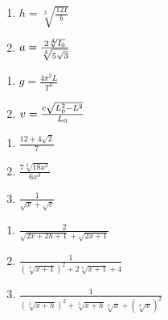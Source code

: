 \documentclass{ximera}
\begin{document}
\begin{multicols}{2}
\begin{enumerate}
\setcounter{enumi}{\value{HW}}


\item $h = \sqrt[3]{\frac{12I}{b}}$ 

\item  $a = \frac{2 \sqrt[4]{I_{\text{\tiny $0$}}}}{\sqrt[4]{5\sqrt{3}}}$

\setcounter{HW}{\value{enumi}}
\end{enumerate}
\end{multicols}


\begin{multicols}{2}
\begin{enumerate}
\setcounter{enumi}{\value{HW}}


\item $g = \frac{4 \pi^2 L}{T^2}$ 

\item $v = \frac{c \sqrt{L_{\text{\tiny $0$}}^2 - L^2}}{L_{\text{\tiny $0$}}}$  

\setcounter{HW}{\value{enumi}}
\end{enumerate}
\end{multicols}




\begin{multicols}{3}
\begin{enumerate}
\setcounter{enumi}{\value{HW}}


\item   $\frac{12 + 4\sqrt{2}}{7}$ 

\item  $\frac{7 \sqrt[3]{18x^2}}{6x^3}$

\item   $\frac{1}{\sqrt{x}+ \sqrt{c}}$

\setcounter{HW}{\value{enumi}}
\end{enumerate}
\end{multicols}

\enlargethispage{1in}

\begin{multicols}{3}
\begin{enumerate}
\setcounter{enumi}{\value{HW}}


\item  $\frac{2}{\sqrt{2x+2h+1} + \sqrt{2x+1}}$                      

\item  $\frac{1}{(\sqrt[3]{x+1})^2 + 2\sqrt[3]{x+1} + 4}$                       

\item  $\frac{1}{(\sqrt[3]{x+h})^2 + \sqrt[3]{x+h}\sqrt[3]{x} + (\sqrt[3]{x})^2}$

\setcounter{HW}{\value{enumi}}
\end{enumerate}
\end{multicols}
\end{document}
